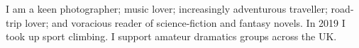 \descript{}
\location{}
I am a keen photographer; music lover; increasingly adventurous traveller; road-trip lover; and voracious reader of science-fiction and fantasy novels.
In 2019 I took up sport climbing.
I support amateur dramatics groups across the UK.

\sectionsep{}
